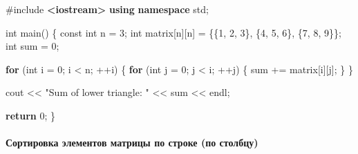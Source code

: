 \documentclass[
]{article}
\newenvironment{Shaded}{}{}
\newcommand{\AttributeTok}[1]{\textcolor[rgb]{0.49,0.56,0.16}{#1}}
\newcommand{\ControlFlowTok}[1]{\textcolor[rgb]{0.00,0.44,0.13}{\textbf{#1}}}
\newcommand{\DataTypeTok}[1]{\textcolor[rgb]{0.56,0.13,0.00}{#1}}
\newcommand{\DecValTok}[1]{\textcolor[rgb]{0.25,0.63,0.44}{#1}}
\newcommand{\ImportTok}[1]{\textcolor[rgb]{0.00,0.50,0.00}{\textbf{#1}}}
\newcommand{\KeywordTok}[1]{\textcolor[rgb]{0.00,0.44,0.13}{\textbf{#1}}}
\newcommand{\NormalTok}[1]{#1}
\newcommand{\OperatorTok}[1]{\textcolor[rgb]{0.40,0.40,0.40}{#1}}
\newcommand{\PreprocessorTok}[1]{\textcolor[rgb]{0.74,0.48,0.00}{#1}}
\newcommand{\StringTok}[1]{\textcolor[rgb]{0.25,0.44,0.63}{#1}}
\begin{document}
\begin{Shaded}
\begin{Highlighting}[]
\PreprocessorTok{\#include }\ImportTok{\textless{}iostream\textgreater{}}
\KeywordTok{using} \KeywordTok{namespace}\NormalTok{ std}\OperatorTok{;}

\DataTypeTok{int}\NormalTok{ main}\OperatorTok{()} \OperatorTok{\{}
    \AttributeTok{const} \DataTypeTok{int}\NormalTok{ n }\OperatorTok{=} \DecValTok{3}\OperatorTok{;}
    \DataTypeTok{int}\NormalTok{ matrix}\OperatorTok{[}\NormalTok{n}\OperatorTok{][}\NormalTok{n}\OperatorTok{]} \OperatorTok{=} \OperatorTok{\{\{}\DecValTok{1}\OperatorTok{,} \DecValTok{2}\OperatorTok{,} \DecValTok{3}\OperatorTok{\},}
                        \OperatorTok{\{}\DecValTok{4}\OperatorTok{,} \DecValTok{5}\OperatorTok{,} \DecValTok{6}\OperatorTok{\},}
                        \OperatorTok{\{}\DecValTok{7}\OperatorTok{,} \DecValTok{8}\OperatorTok{,} \DecValTok{9}\OperatorTok{\}\};}
    \DataTypeTok{int}\NormalTok{ sum }\OperatorTok{=} \DecValTok{0}\OperatorTok{;}

    \ControlFlowTok{for} \OperatorTok{(}\DataTypeTok{int}\NormalTok{ i }\OperatorTok{=} \DecValTok{0}\OperatorTok{;}\NormalTok{ i }\OperatorTok{\textless{}}\NormalTok{ n}\OperatorTok{;} \OperatorTok{++}\NormalTok{i}\OperatorTok{)} \OperatorTok{\{}
        \ControlFlowTok{for} \OperatorTok{(}\DataTypeTok{int}\NormalTok{ j }\OperatorTok{=} \DecValTok{0}\OperatorTok{;}\NormalTok{ j }\OperatorTok{\textless{}}\NormalTok{ i}\OperatorTok{;} \OperatorTok{++}\NormalTok{j}\OperatorTok{)} \OperatorTok{\{}
\NormalTok{            sum }\OperatorTok{+=}\NormalTok{ matrix}\OperatorTok{[}\NormalTok{i}\OperatorTok{][}\NormalTok{j}\OperatorTok{];}
        \OperatorTok{\}}
    \OperatorTok{\}}

\NormalTok{    cout }\OperatorTok{\textless{}\textless{}} \StringTok{"Sum of lower triangle: "} \OperatorTok{\textless{}\textless{}}\NormalTok{ sum }\OperatorTok{\textless{}\textless{}}\NormalTok{ endl}\OperatorTok{;}

    \ControlFlowTok{return} \DecValTok{0}\OperatorTok{;}
\OperatorTok{\}}
\end{Highlighting}
\end{Shaded}

\paragraph{Сортировка элементов матрицы по строке (по
столбцу)}\label{ux441ux43eux440ux442ux438ux440ux43eux432ux43aux430-ux44dux43bux435ux43cux435ux43dux442ux43eux432-ux43cux430ux442ux440ux438ux446ux44b-ux43fux43e-ux441ux442ux440ux43eux43aux435-ux43fux43e-ux441ux442ux43eux43bux431ux446ux443}
\end{document}
